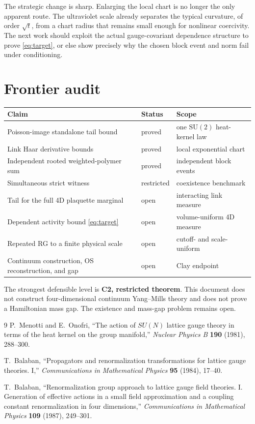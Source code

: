 \documentclass[11pt]{article}
\theoremstyle{definition}
\newcommand{\SU}{\mathrm{SU}(2)}
\newcommand{\proved}{\textcolor{green!45!black}{\textsf{proved}}}
\newcommand{\restricted}{\textcolor{blue!65!black}{\textsf{restricted}}}
\newcommand{\openstatus}{\textcolor{red!70!black}{\textsf{open}}}
\begin{document}
The strategic change is sharp.  Enlarging the local chart is no longer the
only apparent route.  The ultraviolet scale already separates the typical
curvature, of order $\sqrt t$, from a chart radius that remains small enough
for nonlinear coercivity.  The next work should exploit the actual
gauge-covariant dependence structure to prove \eqref{eq:target}, or else show
precisely why the chosen block event and norm fail under conditioning.

\section{Frontier audit}

\begin{longtable}{@{}p{}p{}p{}@{}}
\toprule
Claim & Status & Scope \\
\midrule
\endhead
Poisson-image standalone tail bound & \proved & one $\SU$ heat-kernel law \\
Link Haar derivative bounds & \proved & local exponential chart \\
Independent rooted weighted-polymer sum & \proved & independent block events \\
Simultaneous strict witness & \restricted & coexistence benchmark \\
Tail for the full 4D plaquette marginal & \openstatus & interacting link measure \\
Dependent activity bound \eqref{eq:target} & \openstatus & volume-uniform 4D measure \\
Repeated RG to a finite physical scale & \openstatus & cutoff- and scale-uniform \\
Continuum construction, OS reconstruction, and gap & \openstatus & Clay endpoint \\
\bottomrule
\end{longtable}

The strongest defensible level is \textbf{C2, restricted theorem}.  This
document does not construct four-dimensional continuum Yang--Mills theory and
does not prove a Hamiltonian mass gap.  The existence and mass-gap problem
remains open.

\begin{thebibliography}{9}
P.~Menotti and E.~Onofri,
``The action of $SU(N)$ lattice gauge theory in terms of the heat kernel on the
group manifold,''
\emph{Nuclear Physics B} \textbf{190} (1981), 288--300.

T.~Balaban,
``Propagators and renormalization transformations for lattice gauge
theories. I,''
\emph{Communications in Mathematical Physics} \textbf{95} (1984), 17--40.

T.~Balaban,
``Renormalization group approach to lattice gauge field theories. I.
Generation of effective actions in a small field approximation and a coupling
constant renormalization in four dimensions,''
\emph{Communications in Mathematical Physics} \textbf{109} (1987), 249--301.
\end{thebibliography}
\end{document}
